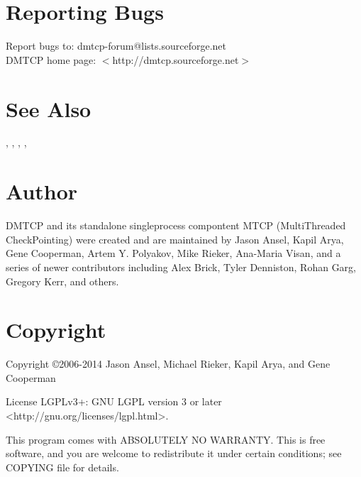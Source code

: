 \section{Reporting Bugs}
Report bugs to: dmtcp-forum@lists.sourceforge.net\\
DMTCP home page: $<$http://dmtcp.sourceforge.net$>$

\section{See Also}
, , ,
, 

\section{Author}
DMTCP and its standalone single\-process compontent MTCP (MultiThreaded
CheckPointing) were created and are maintained by Jason Ansel, Kapil Arya,
Gene Cooperman, Artem Y. Polyakov, Mike Rieker, Ana-Maria Visan, and a series
of newer contributors including Alex Brick, Tyler Denniston, Rohan Garg,
Gregory Kerr, and others.

\section{Copyright}
Copyright \copyright 2006-2014  Jason Ansel, Michael Rieker, Kapil Arya, and
Gene Cooperman

License LGPLv3+: GNU LGPL version 3 or later <http://gnu.org/licenses/lgpl.html>.

This program comes with ABSOLUTELY NO WARRANTY.
This is free software, and you are welcome to redistribute it under certain
conditions; see COPYING file for details.
